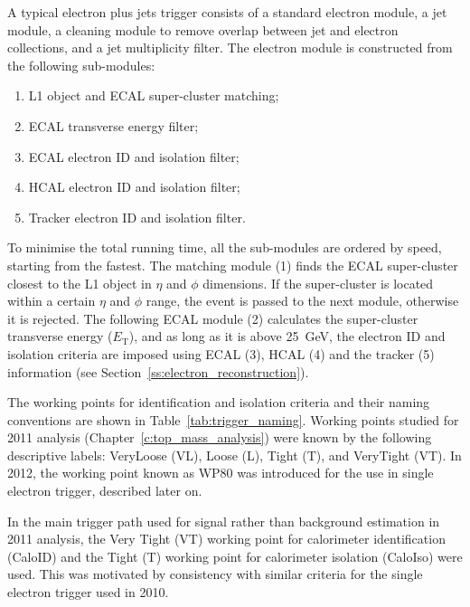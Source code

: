 A typical electron plus jets trigger consists of a standard electron module, a jet module, a cleaning module to remove
overlap between jet and electron collections, and a jet multiplicity filter. The electron module is constructed from the
following sub-modules:

\begin{enumerate}
  \item L1 object and ECAL super-cluster matching;
  \item ECAL transverse energy filter;
  \item ECAL electron ID and isolation filter;
  \item HCAL electron ID and isolation filter;
  \item Tracker electron ID and isolation filter.
\end{enumerate}

To minimise the total running time, all the sub-modules are ordered by speed, starting from the fastest. The matching
module (1) finds the ECAL super-cluster closest to the L1 object in $\eta$ and $\phi$ dimensions. If the super-cluster is
located within a certain $\eta$ and $\phi$ range, the event is passed to the next module, otherwise it is rejected. The
following ECAL module (2) calculates the super-cluster transverse energy ($E_\mathrm{T}$), and as long as it is above
\SI{25}{\GeV}, the electron ID and isolation criteria are imposed using ECAL (3), HCAL (4) and the tracker (5)
information (see Section~\ref{ss:electron_reconstruction}).

The working points for identification and isolation criteria and their naming conventions are shown in
Table~\ref{tab:trigger_naming}. Working points studied for 2011 analysis (Chapter~\ref{c:top_mass_analysis}) were known
by the following descriptive labels: VeryLoose (VL), Loose (L), Tight (T), and VeryTight (VT). In 2012, the working
point known as WP80 was introduced for the use in single electron trigger, described later on.



In the main trigger path used for signal rather than background estimation in 2011 analysis, the Very Tight (VT) working
point for calorimeter identification (CaloID) and the Tight (T) working point for calorimeter isolation (CaloIso) were
used. This was motivated by consistency with similar criteria for the single electron trigger used in 2010.

